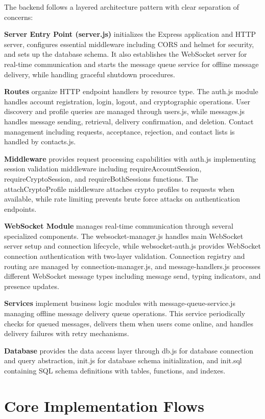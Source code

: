 \documentclass[12pt,a4paper,openany]{book}
\begin{document}
The backend follows a layered architecture pattern with clear separation of concerns:

\textbf{Server Entry Point (server.js)} initializes the Express application and HTTP server, configures essential middleware including CORS and helmet for security, and sets up the database schema. It also establishes the WebSocket server for real-time communication and starts the message queue service for offline message delivery, while handling graceful shutdown procedures.

\textbf{Routes} organize HTTP endpoint handlers by resource type. The auth.js module handles account registration, login, logout, and cryptographic operations. User discovery and profile queries are managed through users.js, while messages.js handles message sending, retrieval, delivery confirmation, and deletion. Contact management including requests, acceptance, rejection, and contact lists is handled by contacts.js.

\textbf{Middleware} provides request processing capabilities with auth.js implementing session validation middleware including requireAccountSession, requireCryptoSession, and requireBothSessions functions. The attachCryptoProfile middleware attaches crypto profiles to requests when available, while rate limiting prevents brute force attacks on authentication endpoints.

\textbf{WebSocket Module} manages real-time communication through several specialized components. The websocket-manager.js handles main WebSocket server setup and connection lifecycle, while websocket-auth.js provides WebSocket connection authentication with two-layer validation. Connection registry and routing are managed by connection-manager.js, and message-handlers.js processes different WebSocket message types including message send, typing indicators, and presence updates.

\textbf{Services} implement business logic modules with message-queue-service.js managing offline message delivery queue operations. This service periodically checks for queued messages, delivers them when users come online, and handles delivery failures with retry mechanisms.

\textbf{Database} provides the data access layer through db.js for database connection and query abstraction, init.js for database schema initialization, and init.sql containing SQL schema definitions with tables, functions, and indexes.

\section{Core Implementation Flows}
\end{document}
